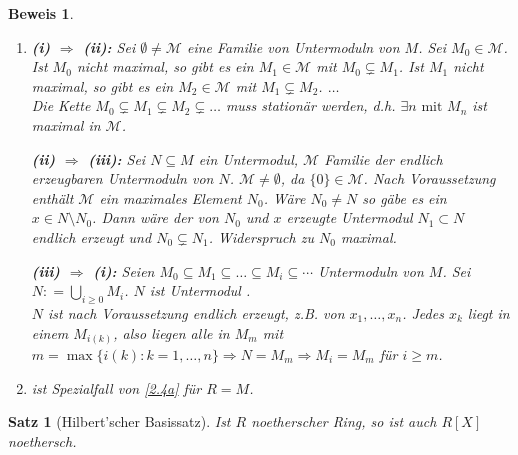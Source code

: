 \documentclass[a4paper,12pt]{scrbook}
\theoremstyle{break}
\newtheorem{Satz}{Satz}
\theoremstyle{nonumberbreak}
\newtheorem{Bew}{Beweis}
\theoremstyle{nonumberplain}
\newcommand{\defeqr}[0]{\mathrel{\mathop:}=}
\begin{document}
\begin{Bew} 
  \begin{enumerate}
    \item
      \textbf{(i) $\Rightarrow$ (ii):} Sei $\emptyset \not= \mathcal{M}$ eine
      Familie von Untermoduln von $M$. Sei $M_0 \in \mathcal{M}$. Ist $M_0$
      nicht maximal, so gibt es ein $M_1 \in \mathcal{M}$ mit $M_0
      \subsetneq M_1$. Ist $M_1$ nicht maximal, so gibt es ein $M_2 \in
      \mathcal{M}$ mit $M_1 \subsetneq M_2$. $\dots$\\
      Die Kette $M_0 \subsetneq M_1 \subsetneq M_2 \subsetneq \dots$ muss
      stationär werden, d.h. $\exists n \mbox{ mit } M_n$ ist maximal in
      $\mathcal{M}$.

      \textbf{(ii) $\Rightarrow$ (iii):} Sei $N \subseteq M$ ein Untermodul,
      $\mathcal{M}$ Familie der endlich erzeugbaren Untermoduln von $N$.
      $\mathcal{M} \not= \emptyset$, da $\{0\} \in \mathcal{M}$. Nach
      Voraussetzung enthält $\mathcal{M}$ ein maximales Element $N_0$. Wäre
      $N_0 \not= N$ so gäbe es ein $x \in N \setminus N_0$. Dann wäre der
      von $N_0$ und $x$ erzeugte Untermodul $N_1 \subset N$ endlich erzeugt
      und $N_0 \subsetneq N_1$. Widerspruch zu $N_0$ maximal.

      \textbf{(iii) $\Rightarrow$ (i):} Seien $M_0 \subseteq M_1 \subseteq
      \dots \subseteq M_i \subseteq \cdots$ Untermoduln von $M$.
      Sei  $N \defeqr \bigcup_{i \ge 0} M_i$. $N$ ist Untermodul \checkmark.\\
      $N$ ist nach Voraussetzung endlich erzeugt, z.B. von $ x_1, \dots ,
      x_n$. Jedes $x_k$ liegt in einem $M_{i(k)}$, also liegen alle in $M_m$
      mit $m = \max\{i(k): k = 1, \dots , n\} \Rightarrow N = M_m \Rightarrow
      M_i = M_m$ für $i \ge m$.

    \item ist Spezialfall von \ref{2.4a} für $R = M$.
  \end{enumerate}
\end{Bew}

\begin{Satz}[Hilbert'scher Basissatz]
\label{Satz4}
  Ist $R$ noetherscher Ring, so ist auch $R[X]$ noethersch.
\end{Satz}
\end{document}
